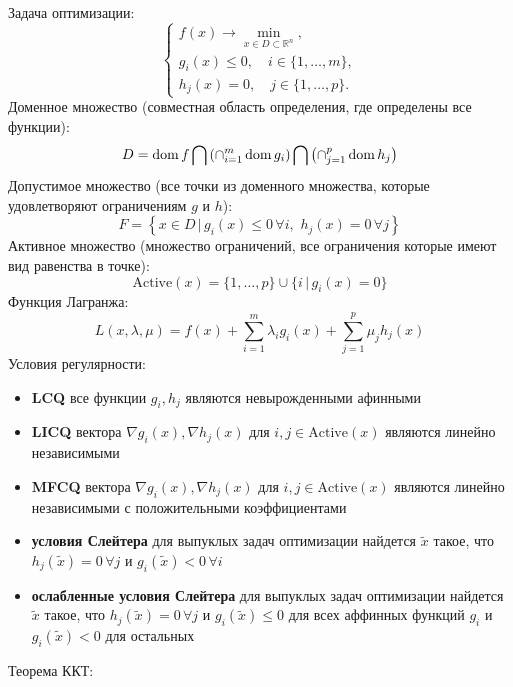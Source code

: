 Задача оптимизации:
\[
    \begin{cases}
        \label{kkt}
        f(x) \to \min\limits_{x \in D \subset \mathbb{R}^{n}}, \\
        g_{i}(x) \leq 0, \quad i \in \{ 1, \dots , m \}, \\
        h_{j}(x) = 0, \quad j \in \{ 1, \dots , p \}.
    \end{cases}
\]
Доменное множество (совместная область определения, где определены все функции):
\[
    D = \operatorname{dom} f \bigcap \left( \operatorname{\cap}\limits_{i=1}^{m} \operatorname{dom} g_{i} \right) \bigcap \left( \operatorname{\cap}\limits_{j=1}^{p} \operatorname{dom} h_{j} \right)
\]
Допустимое множество (все точки из доменного множества, которые удовлетворяют ограничениям $g$ и $h$):
\[
    F = \left\{ x \in D \,|\, g_{i}(x) \leq 0 \, \forall i,\,\, h_{j}(x) = 0 \, \forall j \right\}
\]
Активное множество (множество ограничений, все ограничения которые имеют вид равенства в точке):
\[
    \text{Active} (x) = \{ 1, \dots , p \} \cup \{ i \,|\, g_{i}(x) = 0 \}
\]
Функция Лагранжа:
\[
    L(x, \lambda, \mu) = f(x) + \sum\limits_{i=1}^{m} \lambda_{i} g_{i}(x) + \sum\limits_{j=1}^{p} \mu_{j} h_{j}(x)
\]
Условия регулярности:
\begin{itemize}
    \item \textbf{LCQ} все функции $g_{i}, h_{j}$ являются невырожденными афинными
    \item \textbf{LICQ} вектора $\nabla g_{i}(x), \nabla h_{j}(x)$ для $i, j \in \text{Active}(x)$ являются линейно независимыми
    \item \textbf{MFCQ} вектора $\nabla g_{i}(x), \nabla h_{j}(x)$ для $i, j \in \text{Active}(x)$ являются линейно независимыми с положительными коэффициентами
    \item \textbf{условия Слейтера} для выпуклых задач оптимизации найдется $\widetilde{x}$ такое, что $h_{j}(\widetilde{x}) = 0 \, \forall j$ и $g_{i}(\widetilde{x}) < 0 \, \forall i$
    \item \textbf{ослабленные условия Слейтера} для выпуклых задач оптимизации найдется $\widetilde{x}$ такое, что $h_{j}(\widetilde{x}) = 0 \, \forall j$ и $g_{i}(\widetilde{x}) \leq 0$ для всех аффинных функций $g_{i}$ и $g_{i}(\widetilde{x}) < 0$ для остальных
\end{itemize}
Теорема ККТ:
